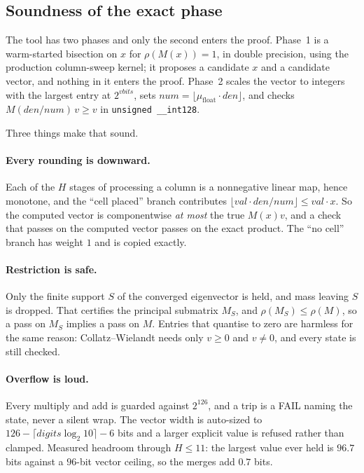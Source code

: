 \documentclass[11pt]{article}
\newcommand{\rhoo}{\rho}
\begin{document}
\subsection{Soundness of the exact phase}
\label{sec:exact}

The tool has two phases and only the second enters the proof. Phase~1 is a
warm-started bisection on $x$ for $\rhoo(M(x)) = 1$, in double precision, using
the production column-sweep kernel; it proposes a candidate $x$ and a candidate
vector, and nothing in it enters the proof. Phase~2 scales the vector to integers
with the largest entry at $2^{\mathit{vbits}}$, sets
$\mathit{num} = \lfloor \mu_{\text{float}} \cdot \mathit{den}\rfloor$, and checks
$M(\mathit{den}/\mathit{num})\,v \ge v$ in \texttt{unsigned \_\_int128}.

Three things make that sound.

\paragraph{Every rounding is downward.} Each of the $H$ stages of processing a column
is a nonnegative linear map, hence monotone, and the ``cell placed'' branch
contributes $\lfloor \mathit{val}\cdot\mathit{den}/\mathit{num}\rfloor \le
\mathit{val}\cdot x$. So the computed vector is componentwise \emph{at most} the
true $M(x)v$, and a check that passes on the computed vector passes on the exact
product. The ``no cell'' branch has weight $1$ and is copied exactly.

\paragraph{Restriction is safe.} Only the finite support $S$ of the converged
eigenvector is held, and mass leaving $S$ is dropped. That certifies the
principal submatrix $M_S$, and $\rhoo(M_S) \le \rhoo(M)$, so a pass on $M_S$
implies a pass on $M$. Entries that quantise to zero are harmless for the same
reason: Collatz--Wielandt needs only $v \ge 0$ and $v \ne 0$, and every state is
still checked.

\paragraph{Overflow is loud.} Every multiply and add is guarded against $2^{126}$,
and a trip is a FAIL naming the state, never a silent wrap. The vector width is
auto-sized to $126 - \lceil \mathit{digits}\log_2 10\rceil - 6$ bits and a larger
explicit value is refused rather than clamped. Measured headroom through
$H \le 11$: the largest value ever held is $96.7$ bits against a $96$-bit vector
ceiling, so the merges add $0.7$ bits.
\end{document}
